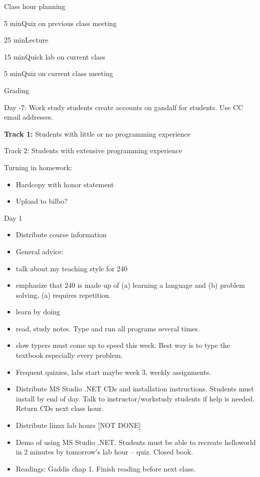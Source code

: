 \documentclass[
]{article}
\author{}
\date{}
\providecommand{\tightlist}{%
  \setlength{\itemsep}{0pt}\setlength{\parskip}{0pt}}
\begin{document}
Class hour planning

5 minQuiz on previous class meeting

25 minLecture

15 minQuick lab on current class

5 minQuiz on current class meeting

Grading

Day -7: Work study students create accounts on gandalf for students. Use
CC email addresses.

\textbf{Track 1:} Students with little or no programming experience

Track 2: Students with extensive programming experience

Turning in homework:

\begin{itemize}
\tightlist
\item
  Hardcopy with honor statement
\item
  Upload to bilbo?
\end{itemize}

Day 1

\begin{itemize}
\tightlist
\item
  Distribute course information
\item
  General advice:
\item
  talk about my teaching style for 240
\item
  emphasize that 240 is made up of (a) learning a language and (b)
  problem solving. (a) requires repetition.
\item
  learn by doing
\item
  read, study notes. Type and run all programs several times.
\item
  slow typers must come up to speed this week. Best way is to type the
  textbook especially every problem.
\item
  Frequent quizzes, labs start maybe week 3, weekly assignments.
\item
  Distribute MS Studio .NET CDs and installation instructions. Students
  must install by end of day. Talk to instructor/workstudy students if
  help is needed. Return CDs next class hour.
\item
  Distribute linux lab hours {[}NOT DONE{]}
\item
  Demo of using MS Studio .NET. Students must be able to recreate
  helloworld in 2 minutes by tomorrow's lab hour -- quiz. Closed book.
\item
  Readings: Gaddis chap 1. Finish reading before next class.
\end{itemize}
\end{document}
